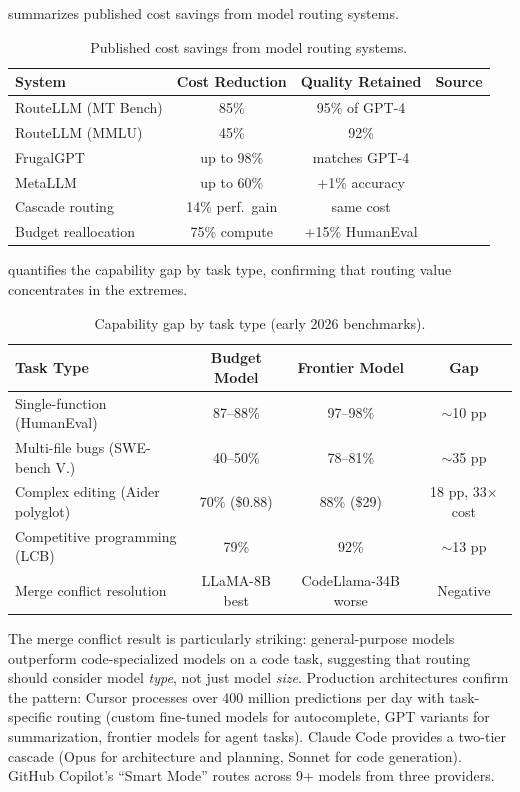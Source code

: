 \documentclass[11pt, a4paper]{googledeepmind}
\begin{document}
 summarizes published cost savings from model routing systems.

\begin{table}[htbp]
\centering
\caption{Published cost savings from model routing systems.}
\label{tab:routing-savings}
\small
\begin{tabular}{lccl}
\toprule
\textbf{System} & \textbf{Cost Reduction} & \textbf{Quality Retained} & \textbf{Source} \\
\midrule
RouteLLM (MT Bench) & 85\% & 95\% of GPT-4 & \citet{routellm2025} \\
RouteLLM (MMLU) & 45\% & 92\% & \citet{routellm2025} \\
FrugalGPT & up to 98\% & matches GPT-4 & \citet{frugalgpt2023} \\
MetaLLM & up to 60\% & +1\% accuracy & \citet{metallm2024} \\
Cascade routing & 14\% perf.\ gain & same cost & \citet{dekoninck2025cascade} \\
Budget reallocation & 75\% compute & +15\% HumanEval & \citet{hassid2024budget} \\
\bottomrule
\end{tabular}
\end{table}

 quantifies the capability gap by task type, confirming that routing value concentrates in the extremes.

\begin{table}[htbp]
\centering
\caption{Capability gap by task type (early 2026 benchmarks).}
\label{tab:routing-capgaps}
\small
\begin{tabular}{lccc}
\toprule
\textbf{Task Type} & \textbf{Budget Model} & \textbf{Frontier Model} & \textbf{Gap} \\
\midrule
Single-function (HumanEval) & 87--88\% & 97--98\% & $\sim$10 pp \\
Multi-file bugs (SWE-bench V.) & 40--50\% & 78--81\% & $\sim$35 pp \\
Complex editing (Aider polyglot) & 70\% (\$0.88) & 88\% (\$29) & 18 pp, 33$\times$ cost \\
Competitive programming (LCB) & 79\% & 92\% & $\sim$13 pp \\
Merge conflict resolution & LLaMA-8B best & CodeLlama-34B worse & Negative \\
\bottomrule
\end{tabular}
\end{table}

The merge conflict result \citep{zhu2024congra} is particularly striking: general-purpose models outperform code-specialized models on a code task, suggesting that routing should consider model \emph{type}, not just model \emph{size}. Production architectures confirm the pattern: Cursor processes over 400 million predictions per day with task-specific routing (custom fine-tuned models for autocomplete, GPT variants for summarization, frontier models for agent tasks). Claude Code provides a two-tier cascade (Opus for architecture and planning, Sonnet for code generation). GitHub Copilot's ``Smart Mode'' routes across 9+ models from three providers.
\end{document}
